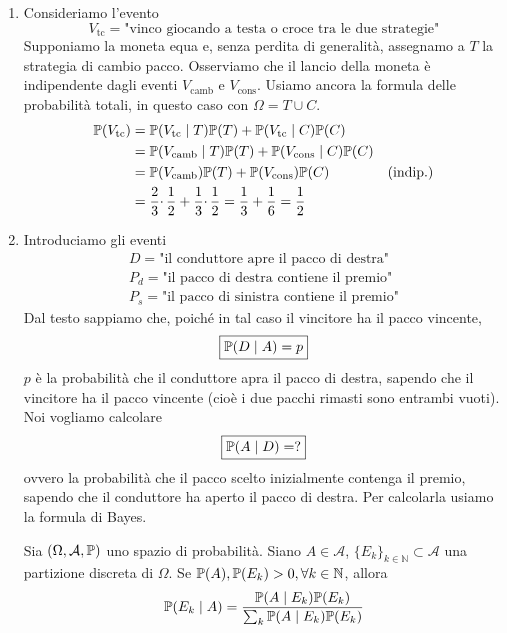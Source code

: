 \begin{enumerate}
	\item Consideriamo l'evento
	\begin{equation*}
		V_{\text{tc}} =\text{"vinco giocando a testa o croce tra le due strategie"}
	\end{equation*}
	Supponiamo la moneta equa e, senza perdita di generalità, assegnamo a $T$ la strategia di cambio pacco. Osserviamo che il lancio della moneta è indipendente dagli eventi $V_{\text{camb}}$ e $V_{\text{cons}}$. Usiamo ancora la formula delle probabilità totali, in questo caso con $\Omega =T\cup C$.
	\begin{align*}
		\mathbb{P}(V_{\text{tc}}) & =\mathbb{P}(V_{\text{tc}} \mid T)\mathbb{P}(T) +\mathbb{P}(V_{\text{tc}} \mid C)\mathbb{P}(C) & \\
		 & =\mathbb{P}(V_{\text{camb}} \mid T)\mathbb{P}(T) +\mathbb{P}(V_{\text{cons}} \mid C)\mathbb{P}(C) & \\
		 & =\mathbb{P}(V_{\text{camb}})\mathbb{P}(T) +\mathbb{P}(V_{\text{cons}})\mathbb{P}(C) & \text{(indip.)}\\
		 & =\frac{2}{3} \cdotp \frac{1}{2} +\frac{1}{3} \cdotp \frac{1}{2} =\frac{1}{3} +\frac{1}{6} =\frac{1}{2} & 
	\end{align*}
	\item Introduciamo gli eventi
	\begin{gather*}
		D=\text{"il conduttore apre il pacco di destra"}\\
		P_{d} =\text{"il pacco di destra contiene il premio"}\\
		P_{s} =\text{"il pacco di sinistra contiene il premio"}
	\end{gather*}
	Dal testo sappiamo che, poiché in tal caso il vincitore ha il pacco vincente,
	\begin{equation*}
		\boxed{\mathbb{P}(D\mid A) =p}
	\end{equation*}
	$p$ è la probabilità che il conduttore apra il pacco di destra, sapendo che il vincitore ha il pacco vincente (cioè i due pacchi rimasti sono entrambi vuoti). Noi vogliamo calcolare
	\begin{equation*}
		\boxed{\mathbb{P}(A\mid D) =?}
	\end{equation*}
	ovvero la probabilità che il pacco scelto inizialmente contenga il premio, sapendo che il conduttore ha aperto il pacco di destra. Per calcolarla usiamo la formula di Bayes.
	\begin{theorem}
		Sia $(\Omega ,\mathcal{A} ,\mathbb{P})$ uno spazio di probabilità. Siano $A\in \mathcal{A}$, $\{E_{k}\}_{k\in \mathbb{N}} \subset \mathcal{A}$ una partizione discreta di $\Omega $. Se $\mathbb{P}(A) ,\mathbb{P}(E_{k})  >0,\forall k\in \mathbb{N}$, allora
		\begin{equation*}
			\mathbb{P}(E_{k} \mid A) =\frac{\mathbb{P}(A\mid E_{k})\mathbb{P}(E_{k})}{\sum_{k}\mathbb{P}(A\mid E_{k})\mathbb{P}(E_{k})}
		\end{equation*}
	\end{theorem}


\end{enumerate}
